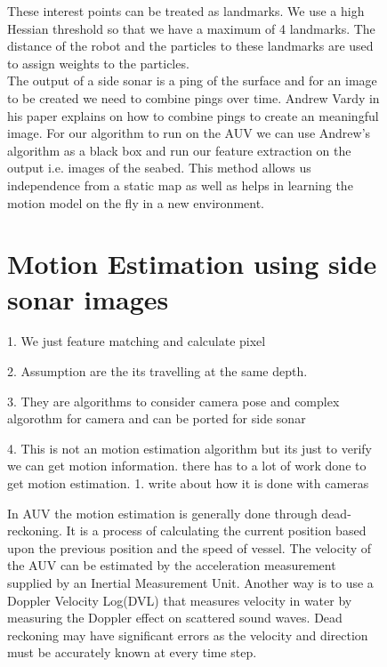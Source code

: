 \documentclass[12pt,draft]{dalcsthesis}
\begin{document}
{{\begin{figure}
{These interest points can be treated as landmarks. We use a high Hessian
threshold so that we have a maximum of 4 landmarks. The distance of the robot and the particles to these landmarks are used to assign weights to the particles.
\\
The output of a side sonar is a ping of the surface and for an image to be created we need to combine pings over time. Andrew Vardy in his paper explains on how to combine pings to create an meaningful image. For our algorithm to run on the AUV we can use Andrew's algorithm as a black box and run our feature extraction on the output i.e. images of the seabed. 
This method allows us independence from a static map as well as helps in learning
the motion model on the fly in a new environment. 

\section{Motion Estimation using side sonar images}

1. We just feature matching and calculate pixel

2. Assumption are the its travelling at the same depth. 

3. They are algorithms to consider camera pose and complex algorothm for camera and can be ported for side sonar 

4. This is not an motion estimation algorithm but its just to verify we can get motion information. there has to a lot of work done to get motion estimation.  
1. write about how it is done with cameras

In AUV the motion estimation is generally done through dead-reckoning.
It is a process of calculating the current position based upon the
previous position and the speed of vessel. The velocity of the AUV
can be estimated by the acceleration measurement supplied by an Inertial
Measurement Unit. Another way is to use a Doppler Velocity Log(DVL) that
measures velocity in water by measuring the Doppler effect on scattered
sound waves. Dead reckoning may have significant errors as the velocity
and direction must be accurately known at every time step. 

}
\end{figure}}}
\end{document}
